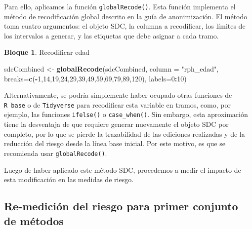\documentclass[]{book}
\newenvironment{Shaded}{\begin{snugshade}}{\end{snugshade}}
\newcommand{\DataTypeTok}[1]{\textcolor[rgb]{0.13,0.29,0.53}{#1}}
\newcommand{\DecValTok}[1]{\textcolor[rgb]{0.00,0.00,0.81}{#1}}
\newcommand{\KeywordTok}[1]{\textcolor[rgb]{0.13,0.29,0.53}{\textbf{#1}}}
\newcommand{\NormalTok}[1]{#1}
\newcommand{\OperatorTok}[1]{\textcolor[rgb]{0.81,0.36,0.00}{\textbf{#1}}}
\newcommand{\StringTok}[1]{\textcolor[rgb]{0.31,0.60,0.02}{#1}}
\theoremstyle{definition}
\theoremstyle{definition}
\newtheorem{example}{Bloque}[chapter]
\theoremstyle{definition}
\theoremstyle{definition}
\theoremstyle{remark}
\begin{document}
Para ello, aplicamos la función \texttt{globalRecode()}. Esta función implementa el método de recodificación global descrito en la guía de anonimización. El método toma cuatro argumentos: el objeto SDC, la columna a recodificar, los límites de los intervalos a generar, y las etiquetas que debe asignar a cada tramo.

\begin{example}
\protect\hypertarget{exm:bloque53nbm}{}{\label{exm:bloque53nbm} }Recodificar edad
\end{example}

\begin{Shaded}
\begin{Highlighting}[]
\NormalTok{sdcCombined <-}\StringTok{ }\KeywordTok{globalRecode}\NormalTok{(sdcCombined,}
                            \DataTypeTok{column =} \StringTok{"rph_edad"}\NormalTok{,}
                            \DataTypeTok{breaks=}\KeywordTok{c}\NormalTok{(}\OperatorTok{-}\DecValTok{1}\NormalTok{,}\DecValTok{14}\NormalTok{,}\DecValTok{19}\NormalTok{,}\DecValTok{24}\NormalTok{,}\DecValTok{29}\NormalTok{,}\DecValTok{39}\NormalTok{,}\DecValTok{49}\NormalTok{,}\DecValTok{59}\NormalTok{,}\DecValTok{69}\NormalTok{,}\DecValTok{79}\NormalTok{,}\DecValTok{89}\NormalTok{,}\DecValTok{120}\NormalTok{),}
                            \DataTypeTok{labels=}\DecValTok{0}\OperatorTok{:}\DecValTok{10}\NormalTok{)}
\end{Highlighting}
\end{Shaded}

Alternativamente, se podría simplemente haber ocupado otras funciones de \texttt{R\ base} o de \texttt{Tidyverse} para recodificar esta variable en tramos, como, por ejemplo, las funciones \texttt{ifelse()} o \texttt{case\_when()}. Sin embargo, esta aproximación tiene la desventaja de que requiere generar nuevamente el objeto SDC por completo, por lo que se pierde la trazabilidad de las ediciones realizadas y de la reducción del riesgo desde la línea base inicial. Por este motivo, es que se recomienda usar \texttt{globalRecode()}.

Luego de haber aplicado este método SDC, procedemos a medir el impacto de esta modificación en las medidas de riesgo.

\hypertarget{re-mediciuxf3n-del-riesgo-para-primer-conjunto-de-muxe9todos}{%
\subsection{Re-medición del riesgo para primer conjunto de métodos}\label{re-mediciuxf3n-del-riesgo-para-primer-conjunto-de-muxe9todos}}
\end{document}
